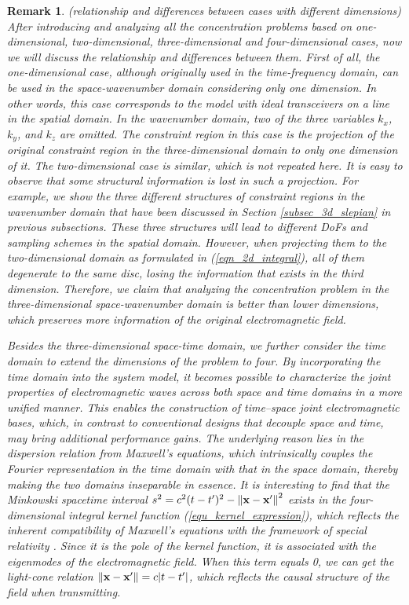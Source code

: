 \documentclass[12pt,draftclsnofoot,journal,onecolumn]{IEEEtran}
\newtheorem{remark}{Remark}
\begin{document}
	{\color{red}
	\begin{remark}
		(relationship and differences between cases with different dimensions) After introducing and analyzing all the concentration problems based on one-dimensional, two-dimensional, three-dimensional and four-dimensional cases, now we will discuss the relationship and differences between them. First of all, the one-dimensional case, although originally used in the time-frequency domain, can be used in the space-wavenumber domain considering only one dimension. In other words, this case corresponds to the model with ideal transceivers on a line in the spatial domain. In the wavenumber domain, two of the three variables $k_x$, $k_y$, and $k_z$ are omitted. The constraint region in this case is the projection of the original constraint region in the three-dimensional domain to only one dimension of it. The two-dimensional case is similar, which is not repeated here. It is easy to observe that some structural information is lost in such a projection. For example, we show the three different structures of constraint regions in the wavenumber domain that have been discussed in Section \ref{subsec_3d_slepian} in previous subsections. These three structures will lead to different DoFs and sampling schemes in the spatial domain. However, when projecting them to the two-dimensional domain as formulated in (\ref{eqn_2d_integral}), all of them degenerate to the same disc, losing the information that exists in the third dimension. Therefore, we claim that analyzing the concentration problem in the three-dimensional space-wavenumber domain is better than lower dimensions, which preserves more information of the original electromagnetic field. 

		Besides the three-dimensional space-time domain, we further consider the time domain to extend the dimensions of the problem to four. By incorporating the time domain into the system model, it becomes possible to characterize the joint properties of electromagnetic waves across both space and time domains in a more unified manner. This enables the construction of time–space joint electromagnetic bases, which, in contrast to conventional designs that decouple space and time, may bring additional performance gains. The underlying reason lies in the dispersion relation from Maxwell's equations, which intrinsically couples the Fourier representation in the time domain with that in the space domain, thereby making the two domains inseparable in essence. It is interesting to find that the Minkowski spacetime interval $s^2 = c^2(t-t')^2 - \left\| {\bf x}-{\bf x}' \right\|^2$ exists in the four-dimensional integral kernel function (\ref{equ_kernel_expression}), which reflects the inherent compatibility of Maxwell’s equations with the framework of special relativity \cite{schwinger2019classical}. Since it is the pole of the kernel function, it is associated with the eigenmodes of the electromagnetic field. When this term equals 0, we can get the light-cone relation $\left\| {\bf x}-{\bf x}' \right\|= c|t-t'|$, which reflects the causal structure of the field when transmitting.



\end{remark}}
\end{document}
